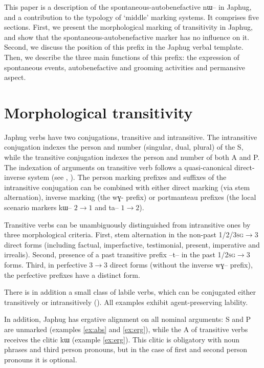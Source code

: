 \documentclass[oldfontcommands,oneside,a4paper,11pt]{article}
\newcommand{\ipa}[1]{{\phon \mbox{#1}}} %
\begin{document}
 
 This paper is a description of the spontaneous-autobenefactive  \ipa{nɯ--}  in Japhug, and a contribution to the typology of ‘middle’ marking systems. It comprises five sections. First, we present the morphological marking  of transitivity in Japhug, and show that the spontaneous-autobenefactive   marker has no influence on it. Second, we discuss the position of this prefix  in the Japhug verbal template. Then, we describe the three main functions of this prefix: the expression of spontaneous events, autobenefactive and grooming activities and  permansive aspect.
 

\section{Morphological transitivity}

Japhug verbs have two conjugations, transitive and intransitive. The intransitive conjugation indexes the person and number (singular, dual, plural) of the S, while the transitive conjugation indexes the person and number of both A and P. The indexation of arguments on transitive verb follows a quasi-canonical direct-inverse system (see \citealt{jacques10inverse}, \citealt{jacques14inverse}). The person marking prefixes and suffixes of the intransitive conjugation can be combined with either direct marking (via stem alternation), inverse marking (the \ipa{wɣ-} prefix) or portmanteau prefixes (the local scenario markers \ipa{kɯ--} $2\rightarrow1$ and \ipa{ta--} $1\rightarrow2$).

Transitive verbs can be unambiguously distinguished from intransitive ones by three morphological criteria. First, stem alternation in the non-past  \textsc{1/2/3sg}$\rightarrow$3 direct forms (including factual, imperfactive, testimonial, present, imperative and irrealis). Second, presence of a past transitive prefix \ipa{--t--} in the past \textsc{1/2sg}$\rightarrow$3 forms. Third, in perfective 3$\rightarrow$3 direct forms (without the inverse \ipa{wɣ--} prefix), the perfective prefixes have a distinct form.

There is in addition a small class of labile verbs, which can be conjugated either transitively or intransitively (\citealt{jacques12demotion}). All examples exhibit agent-preserving  lability.

In addition, Japhug has ergative alignment on all nominal arguments:  S and P are unmarked (examples \ref{ex:abs} and \ref{ex:erg}), while the A of transitive verbs receives the clitic \ipa{kɯ} (example \ref{ex:erg}). This clitic is obligatory with noun phrases and third person pronouns, but in the case of first and second person pronouns it is optional.  
\end{document}

